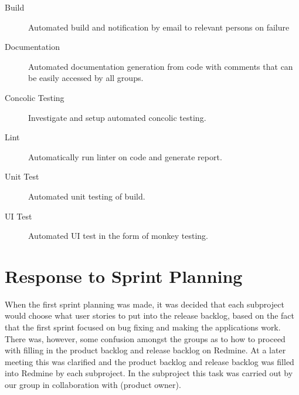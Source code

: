 \begin{description}
    \item[Build] Automated build and notification by email to relevant persons on failure
    \item[Documentation] Automated documentation generation from code with comments that can be easily accessed by all groups.
    \item[Concolic Testing] Investigate and setup automated concolic testing.
    \item[Lint] Automatically run linter on code and generate report.
    \item[Unit Test] Automated unit testing of build.
    \item[UI Test] Automated UI test in the form of monkey testing.
\end{description}

\section{Response to Sprint Planning}
When the first sprint planning was made, it was decided that each subproject would choose what user stories to put into the release backlog, based on the fact that the first sprint focused on bug fixing and making the applications work. There was, however, some confusion amongst the groups as to how to proceed with filling in the product backlog and release backlog on Redmine. At a later meeting this was clarified and the product backlog and release backlog was filled into Redmine by each subproject. In the \bd subproject this task was carried out by our group in collaboration with  (\bd product owner).